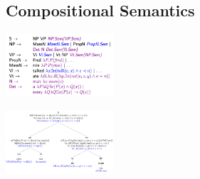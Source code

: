 \documentclass[8pt]{extarticle} %
\begin{document}
\begin{multicols*}{3}
\subsection*{Compositional Semantics}
\begin{center}
    \includegraphics[width=0.3\textwidth]{media/semantic-grammar.png}
\end{center}
\begin{center}
    \includegraphics[width=0.3\textwidth]{media/semantic-tree.png}
\end{center}


\end{multicols*}
\end{document}
